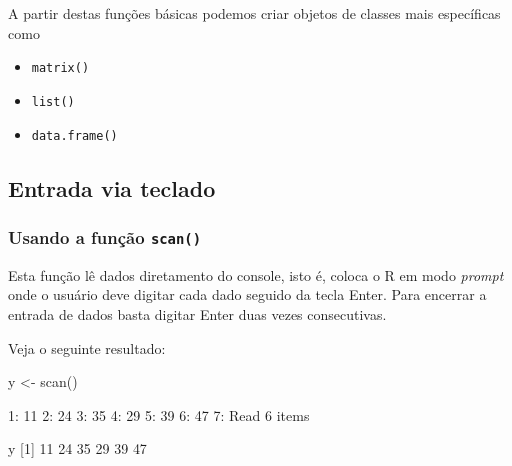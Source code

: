 \documentclass[
  10pt,
  a4paper]{book}
\newenvironment{Shaded}{\begin{snugshade}}{\end{snugshade}}
\newcommand{\DecValTok}[1]{\textcolor[rgb]{0.00,0.00,0.81}{#1}}
\newcommand{\FunctionTok}[1]{\textcolor[rgb]{0.00,0.00,0.00}{#1}}
\newcommand{\NormalTok}[1]{#1}
\newcommand{\OtherTok}[1]{\textcolor[rgb]{0.56,0.35,0.01}{#1}}
\newcommand{\SpecialCharTok}[1]{\textcolor[rgb]{0.00,0.00,0.00}{#1}}
\providecommand{\tightlist}{%
  \setlength{\itemsep}{0pt}\setlength{\parskip}{0pt}}
\begin{document}
A partir destas funções básicas podemos criar objetos de classes mais
específicas como

\begin{itemize}
\tightlist
\item
  \texttt{matrix()}
\item
  \texttt{list()}
\item
  \texttt{data.frame()}
\end{itemize}

\hypertarget{entrada-via-teclado}{%
\subsection{Entrada via teclado}\label{entrada-via-teclado}}

\hypertarget{usando-a-funuxe7uxe3o-scan}{%
\subsubsection{\texorpdfstring{Usando a função \texttt{scan()}}{Usando a função scan()}}\label{usando-a-funuxe7uxe3o-scan}}

Esta função lê dados diretamento do console, isto é, coloca o R em modo
\emph{prompt} onde o usuário deve digitar cada dado seguido da tecla
Enter. Para encerrar a entrada de dados basta digitar
Enter duas vezes consecutivas.

Veja o seguinte resultado:

\begin{Shaded}
\begin{Highlighting}[]
\NormalTok{y }\OtherTok{\textless{}{-}} \FunctionTok{scan}\NormalTok{()}

\DecValTok{1}\SpecialCharTok{:} \DecValTok{11}
\DecValTok{2}\SpecialCharTok{:} \DecValTok{24}
\DecValTok{3}\SpecialCharTok{:} \DecValTok{35}
\DecValTok{4}\SpecialCharTok{:} \DecValTok{29}
\DecValTok{5}\SpecialCharTok{:} \DecValTok{39}
\DecValTok{6}\SpecialCharTok{:} \DecValTok{47}
\DecValTok{7}\SpecialCharTok{:}
\NormalTok{Read }\DecValTok{6}\NormalTok{ items}
\end{Highlighting}
\end{Shaded}

\begin{Shaded}
\begin{Highlighting}[]
\NormalTok{y}
\NormalTok{[}\DecValTok{1}\NormalTok{] }\DecValTok{11} \DecValTok{24} \DecValTok{35} \DecValTok{29} \DecValTok{39} \DecValTok{47}
\end{Highlighting}
\end{Shaded}
\end{document}
